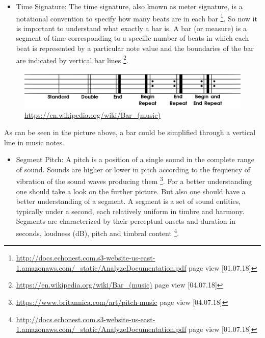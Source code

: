 \documentclass[]{article}
\providecommand{\tightlist}{%
  \setlength{\itemsep}{0pt}\setlength{\parskip}{0pt}}
\let\rmarkdownfootnote\footnote%
\def\footnote{\protect\rmarkdownfootnote}
\begin{document}
\begin{itemize}
  a piece \footnote{\url{http://docs.echonest.com.s3-website-us-east-1.amazonaws.com/_static/AnalyzeDocumentation.pdf}
    page view {[}01.07.18{]}}. An example of a key could be C C\# D E F
  G etc.
\item
  Time Signature: The time signature, also known as meter signature, is
  a notational convention to specify how many beats are in each bar
  \footnote{\url{http://docs.echonest.com.s3-website-us-east-1.amazonaws.com/_static/AnalyzeDocumentation.pdf}
    page view {[}01.07.18{]}}. So now it is important to understand what
  exactly a bar is. A bar (or measure) is a segment of time
  corresponding to a specific number of beats in which each beat is
  represented by a particular note value and the boundaries of the bar
  are indicated by vertical bar lines \footnote{\url{https://en.wikipedia.org/wiki/Bar_(music)}
    page view {[}04.07.18{]}}.
\end{itemize}

\begin{figure}
\centering
\includegraphics{./picturesDocu/970px-Barlines.svg.png}
\caption{\url{https://en.wikipedia.org/wiki/Bar_(music)}}
\end{figure}

As can be seen in the picture above, a bar could be simplified through a
vertical line in music notes.

\begin{itemize}
\tightlist
\item
  Segment Pitch: A pitch is a position of a single sound in the complete
  range of sound. Sounds are higher or lower in pitch according to the
  frequency of vibration of the sound waves producing them \footnote{\url{https://www.britannica.com/art/pitch-music}
    page view {[}04.07.18{]}}. For a better understanding one should
  take a look on the further picture. But also one should have a better
  understanding of a segment. A segment is a set of sound entities,
  typically under a second, each relatively uniform in timbre and
  harmony. Segments are characterized by their perceptual onsets and
  duration in seconds, loudness (dB), pitch and timbral content
  \footnote{\url{http://docs.echonest.com.s3-website-us-east-1.amazonaws.com/_static/AnalyzeDocumentation.pdf}
    page view {[}01.07.18{]}}.
\end{itemize}
\end{document}
